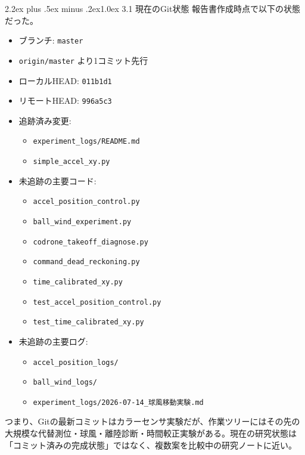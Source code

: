 \documentclass[10pt,a4paper,openany]{ltjsbook}
\makeatletter
\renewcommand\section{\@startsection{section}{1}{0pt}%
  {2.2ex plus .5ex minus .2ex}{1.0ex}%
  {\sffamily\Large\bfseries\color{ReportNavy}}}
\makeatother
\begin{document}
\section{3.1 現在のGit状態}
報告書作成時点で以下の状態だった。\par
\begin{itemize}
\item ブランチ: \texttt{master}
\item \texttt{origin/master} より1コミット先行
\item ローカルHEAD: \texttt{011b1d1}
\item リモートHEAD: \texttt{996a5c3}
\item 追跡済み変更:
\begin{itemize}
\item \texttt{experiment\_logs/README.md}
\item \texttt{simple\_accel\_xy.py}
\end{itemize}
\item 未追跡の主要コード:
\begin{itemize}
\item \texttt{accel\_position\_control.py}
\item \texttt{ball\_wind\_experiment.py}
\item \texttt{codrone\_takeoff\_diagnose.py}
\item \texttt{command\_dead\_reckoning.py}
\item \texttt{time\_calibrated\_xy.py}
\item \texttt{test\_accel\_position\_control.py}
\item \texttt{test\_time\_calibrated\_xy.py}
\end{itemize}
\item 未追跡の主要ログ:
\begin{itemize}
\item \texttt{accel\_position\_logs/}
\item \texttt{ball\_wind\_logs/}
\item \texttt{experiment\_logs/2026-07-14\_球風移動実験.md}
\end{itemize}
\end{itemize}
つまり、Gitの最新コミットはカラーセンサ実験だが、作業ツリーにはその先の大規模な代替測位・球風・離陸診断・時間較正実験がある。現在の研究状態は「コミット済みの完成状態」ではなく、複数案を比較中の研究ノートに近い。\par
\end{document}
